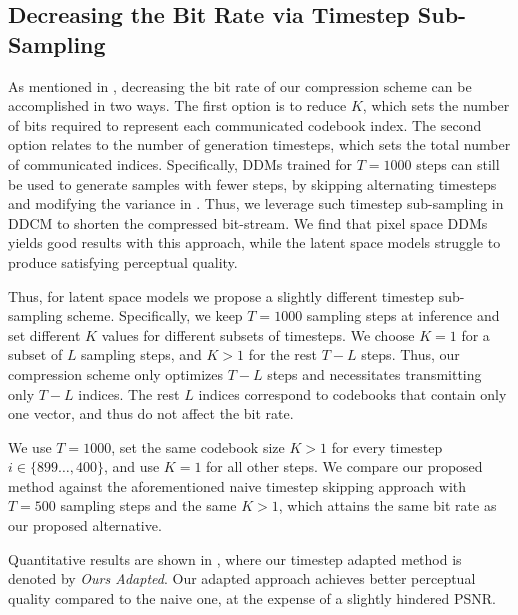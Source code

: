 \subsection{Decreasing the Bit Rate via Timestep Sub-Sampling}\label{app:range_t}

As mentioned in , decreasing the bit rate of our compression scheme can be accomplished in two ways.
The first option is to reduce $K$, which sets the number of bits required to represent each communicated codebook index.
The second option relates to the number of generation timesteps, which sets the total number of communicated indices. Specifically, DDMs trained for $T=1000$ steps can still be used to generate samples with fewer steps, by skipping alternating timesteps and modifying the variance in . 
Thus, we leverage such timestep sub-sampling in DDCM to shorten the compressed bit-stream.
We find that pixel space DDMs yields good results with this approach, while the latent space models struggle to produce satisfying perceptual quality.

Thus, for latent space models we propose a slightly different timestep sub-sampling scheme. 
Specifically, we keep $T=1000$ sampling steps at inference and set different $K$ values for different subsets of timesteps.
We choose $K=1$ for a subset of $L$ sampling steps, and $K>1$ for the rest $T-L$ steps.
Thus, our compression scheme only optimizes $T-L$ steps and necessitates transmitting only $T-L$ indices. The rest $L$ indices correspond to codebooks that contain only one vector, and thus do not affect the bit rate.

We use $T=1000$, set the same codebook size $K>1$ for every timestep $i\in\{899\ldots,400\}$, and use $K=1$ for all other steps.
We compare our proposed method against the aforementioned naive timestep skipping approach with $T=500$ sampling steps and the same $K>1$, which attains the same bit rate as our proposed alternative.

Quantitative results are shown in , where our timestep adapted method is denoted by \emph{Ours Adapted}.
Our adapted approach achieves better perceptual quality compared to the naive one, at the expense of a slightly hindered PSNR.


